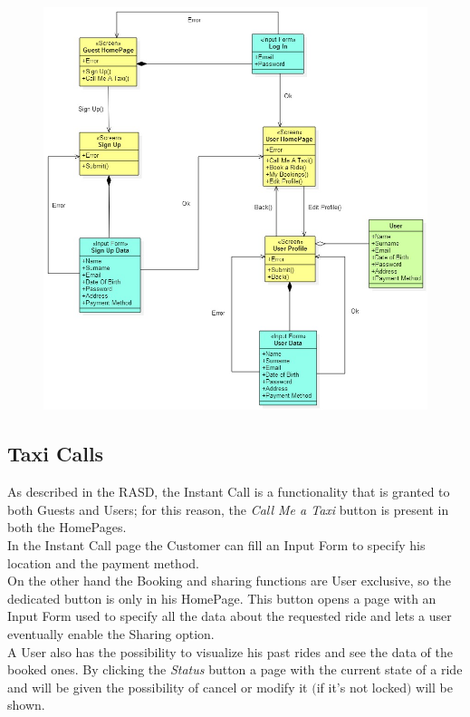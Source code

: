 	\begin{figure}[h!]
		\centering
		\includegraphics[height=0.65\textheight]{UXDiagrams/UXProfile.jpg}
	\end{figure}
	
\newpage
\subsection{Taxi Calls}
As described in the RASD, the Instant Call is a functionality that is granted to both Guests and Users; for this reason, the \textit{Call Me a Taxi} button is present in both the HomePages. \\
In the Instant Call page the Customer can fill an Input Form to specify his location and the payment method.\\
On the other hand the Booking and sharing functions are User exclusive, so the dedicated button is only in his HomePage. This button opens a page with an Input Form used to specify all the data about the requested ride and lets a user eventually enable the Sharing option.\\
A User also has the possibility to visualize his past rides and see the data of the booked ones. By clicking the \textit{Status} button a page with the current state of a ride and will be given the possibility of cancel or modify it $($if it's not locked$)$ will be shown.

